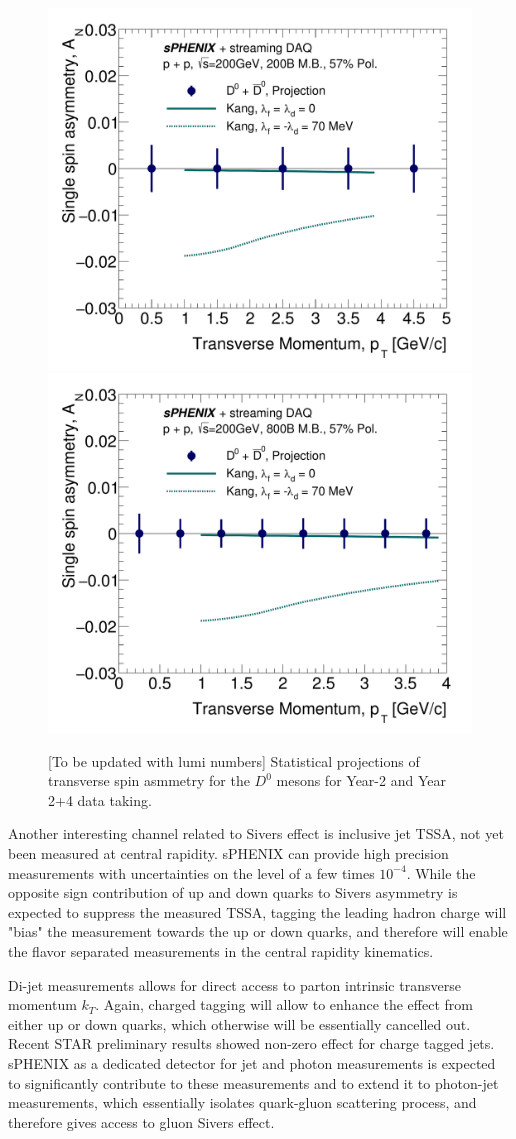 \begin{figure}[htbp]
\begin{center}
\includegraphics[width=.49\linewidth]{figs/RAA_DB_theory_root_AN_D0D0bar_pp200B.pdf}
\includegraphics[width=.49\linewidth]{figs/RAA_DB_theory_root_AN_D0D0bar.pdf}
\caption{[To be updated with lumi numbers] Statistical projections of transverse spin asmmetry for the $D^0$ mesons for Year-2 and Year 2+4 data taking.}
\label{fig:AN-D0}
\end{center}
\end{figure}


Another interesting channel related to Sivers effect is inclusive jet TSSA, not yet been measured at central rapidity. sPHENIX can provide high precision measurements with uncertainties on the level of a few times $10^{-4}$. While the opposite sign contribution of up and down quarks to Sivers asymmetry is expected to suppress the measured TSSA, tagging the leading hadron charge will "bias" the measurement towards the up or down quarks, and therefore will enable the flavor separated measurements in the central rapidity kinematics.

Di-jet measurements allows for direct access to parton intrinsic transverse momentum $k_T$. Again, charged tagging will allow to enhance the effect from either up or down quarks, which otherwise will be essentially cancelled out. Recent STAR preliminary results showed non-zero effect for charge tagged jets. sPHENIX as a dedicated detector for jet and photon measurements is expected to significantly contribute to these measurements and to extend it to photon-jet measurements, which essentially isolates quark-gluon scattering process, and therefore gives access to gluon Sivers effect.

